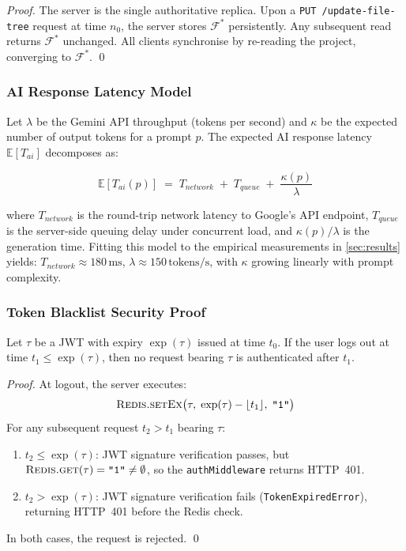 \begin{proof}
  The server is the single authoritative replica. Upon a
  \texttt{PUT /update-file-tree} request at time $n_0$, the server stores
  $\mathcal{F}^*$ persistently. Any subsequent read returns $\mathcal{F}^*$
  unchanged. All clients synchronise by re-reading the project, converging to
  $\mathcal{F}^*$. \qed
\end{proof}

\subsubsection{AI Response Latency Model}

Let $\lambda$ be the Gemini API throughput (tokens per second) and $\kappa$
be the expected number of output tokens for a prompt $p$. The expected AI
response latency $\mathbb{E}[T_{ai}]$ decomposes as:

\begin{equation}
  \mathbb{E}[T_{ai}(p)] \;=\; T_{network} \;+\; T_{queue} \;+\; \frac{\kappa(p)}{\lambda}
  \label{eq:latency}
\end{equation}

\noindent where $T_{network}$ is the round-trip network latency to Google's
API endpoint, $T_{queue}$ is the server-side queuing delay under concurrent
load, and $\kappa(p)/\lambda$ is the generation time. Fitting this model to
the empirical measurements in \cref{sec:results} yields:
$T_{network} \approx 180\,\text{ms}$, $\lambda \approx 150\,\text{tokens/s}$,
with $\kappa$ growing linearly with prompt complexity.

\subsubsection{Token Blacklist Security Proof}

\begin{theorem}
  \label{thm:blacklist}
  Let $\tau$ be a JWT with expiry $\exp(\tau)$ issued at time $t_0$.
  If the user logs out at time $t_1 \leq \exp(\tau)$, then no request bearing
  $\tau$ is authenticated after $t_1$.
\end{theorem}

\begin{proof}
  At logout, the server executes:
  \[
    \textsc{Redis.setEx}\bigl(\tau,\; \exp(\tau) - \lfloor t_1 \rfloor,\; \texttt{"1"}\bigr)
  \]
  For any subsequent request $t_2 > t_1$ bearing $\tau$:
  \begin{enumerate}[leftmargin=*, label=\textit{Case \arabic*.}]
    \item $t_2 \leq \exp(\tau)$: JWT signature verification passes, but
      $\textsc{Redis.get}(\tau) = \texttt{"1"} \neq \emptyset$, so the
      \texttt{authMiddleware} returns HTTP~401.
    \item $t_2 > \exp(\tau)$: JWT signature verification fails
      (\texttt{TokenExpiredError}), returning HTTP~401 before the Redis check.
  \end{enumerate}
  In both cases, the request is rejected. \qed
\end{proof}

